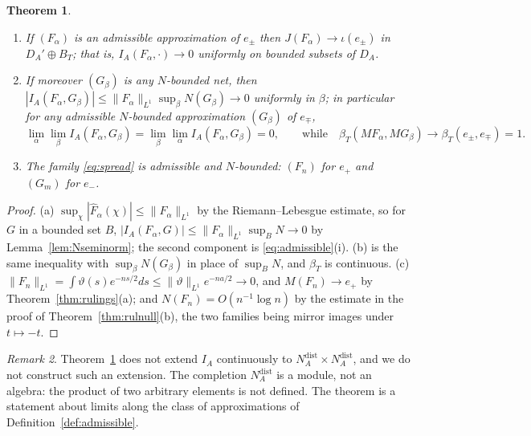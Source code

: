 \documentclass[11pt]{amsart}
\newtheorem{theorem}{Theorem}[section]
\theoremstyle{definition}
\theoremstyle{remark}
\newtheorem{remark}[theorem]{Remark}
\newcommand{\DA}{D_A}
\newcommand{\BT}{B_T}
\newcommand{\NAd}{N_A^{\mathrm{dist}}}
\begin{document}
\begin{theorem}\label{thm:rulnullclass}
\begin{enumerate}
\item[(a)] If $(F_{\alpha})$ is an admissible approximation of $e_{\pm}$ then
$J(F_{\alpha})\to \iota(e_{\pm})$ in $\DA'\oplus\BT$; that is, $I_A(F_{\alpha},
\cdot)\to0$ uniformly on bounded subsets of $\DA$.
\item[(b)] If moreover $(G_{\beta})$ is any $N$-bounded net, then
$|I_A(F_{\alpha},G_{\beta})|\le\lVert F_{\alpha}\rVert_{L^1}\sup_{\beta}
N(G_{\beta})\to0$ uniformly in $\beta$; in particular for any admissible
$N$-bounded approximation $(G_{\beta})$ of $e_{\mp}$,
\begin{equation}\label{eq:doublelimit}
\lim_{\alpha}\lim_{\beta}I_A(F_{\alpha},G_{\beta})
=\lim_{\beta}\lim_{\alpha}I_A(F_{\alpha},G_{\beta})=0,\qquad\text{while}\quad
\beta_T(MF_{\alpha},MG_{\beta})\to\beta_T(e_{\pm},e_{\mp})=1 .
\end{equation}
\item[(c)] The family \eqref{eq:spread} is admissible and $N$-bounded:
$(F_n)$ for $e_+$ and $(G_m)$ for $e_-$.
\end{enumerate}
\end{theorem}

\begin{proof}
(a)  $\sup_{\chi}|\widehat F_{\alpha}(\chi)|\le\lVert F_{\alpha}\rVert_{L^1}$
by the Riemann--Lebesgue estimate, so for $G$ in a bounded set $B$,
$|I_A(F_{\alpha},G)|\le\lVert F_{\alpha}\rVert_{L^1}\sup_BN\to0$ by
Lemma~\ref{lem:Nseminorm}; the second component is \eqref{eq:admissible}(i).
(b) is the same inequality with $\sup_{\beta}N(G_{\beta})$ in place of
$\sup_BN$, and $\beta_T$ is continuous.  (c)
$\lVert F_n\rVert_{L^1}=\int\vartheta(s)e^{-ns/2}ds\le\lVert\vartheta\rVert_{L^1}
e^{-na/2}\to0$, and $M(F_n)\to e_+$ by Theorem~\ref{thm:rulings}(a); and
$N(F_n)=O(n^{-1}\log n)$ by the estimate in the proof of
Theorem~\ref{thm:rulnull}(b), the two families being mirror images under
$t\mapsto-t$.
\end{proof}

\begin{remark}\label{rem:noextension}
Theorem~\ref{thm:rulnullclass} does not extend $I_A$ continuously to
$\NAd\times\NAd$, and we do not construct such an extension.  The completion
$\NAd$ is a module, not an algebra: the product of two arbitrary elements is
not defined.  The theorem is a statement about limits along the class of
approximations of Definition~\ref{def:admissible}.
\end{remark}
\end{document}
